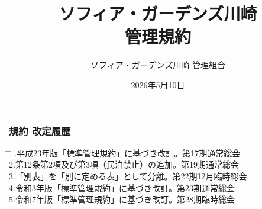 \documentclass[
  luatex,
  paper=a4paper,
  fontsize=11pt,
  jafontsize=11pt,
  jlreq_notes,
]{jlreq}
\renewcommand{\baselinestretch}{0.9}
\begin{document}
  \pagestyle{empty} %
  \title{ソフィア・ガーデンズ川崎\\管理規約}
  \date{2026年5月10日}
  \maketitle
  \thispagestyle{empty}
  \vfill      %

  \begin{center}
    \vspace*{3\baselineskip}
    \author{\Large ソフィア・ガーデンズ川崎 管理組合}
  \end{center}
  \vspace*{2\baselineskip}
  { \renewcommand{\baselinestretch}{0.8}\selectfont   %
    \subsubsection*{ 規約 改定履歴 }
    \small
    \vspace*{1\baselineskip}
    \begin{tabbing}
      \hspace{5mm} \= \hspace{90mm} \= \hspace{100mm} .\>平成23年版「標準管理規約」に基づき改訂。\>第17期通常総会\\
      2.\>第12条第2項及び第3項（民泊禁止）の追加。\>第19期通常総会\\
      3.\>「別表」を「別に定める表」として分離。\>第22期12月臨時総会\\
      4.\>令和3年版「標準管理規約」に基づき改訂。\>第23期通常総会\\
      5.\>令和7年版「標準管理規約」に基づき改訂。\>第28期臨時総会\\
    \end{tabbing}
  }
  \clearpage

  { \renewcommand{\baselinestretch}{0.8}\selectfont
    \tableofcontents        %
  }
  \clearpage

  \setcounter{page}{1}    %
  \pagestyle{plain}       %
\end{document}
